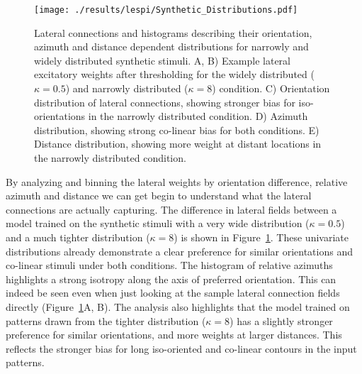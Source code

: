 \begin{figure}
	\centering
    \texttt{[image: ./results/lespi/Synthetic\_Distributions.pdf]}
	\caption[Distributions of lateral connections of models trained on
      synthetic stimuli]{Lateral connections and histograms describing
      their orientation, azimuth and distance dependent distributions
      for narrowly and widely distributed synthetic stimuli. A, B)
      Example lateral excitatory weights after thresholding for the
      widely distributed ($\kappa=0.5$) and narrowly distributed
      ($\kappa=8$) condition. C) Orientation distribution of lateral
      connections, showing stronger bias for iso-orientations in the
      narrowly distributed condition. D) Azimuth distribution, showing
      strong co-linear bias for both conditions. E) Distance
      distribution, showing more weight at distant locations in the
      narrowly distributed condition.}
	\label{SyntheticDistributions}
\end{figure}

By analyzing and binning the lateral weights by orientation
difference, relative azimuth and distance we can get begin to
understand what the lateral connections are actually capturing. The
difference in lateral fields between a model trained on the synthetic
stimuli with a very wide distribution ($\kappa=0.5$) and a much
tighter distribution ($\kappa=8$) is shown in
Figure~\ref{SyntheticDistributions}. These univariate distributions
already demonstrate a clear preference for similar orientations and
co-linear stimuli under both conditions. The histogram of relative
azimuths highlights a strong isotropy along the axis of preferred
orientation. This can indeed be seen even when just looking at the
sample lateral connection fields directly
(Figure~\ref{SyntheticDistributions}A, B). The analysis also
highlights that the model trained on patterns drawn from the tighter
distribution ($\kappa=8$) has a slightly stronger preference for
similar orientations, and more weights at larger distances. This
reflects the stronger bias for long iso-oriented and co-linear
contours in the input patterns.

